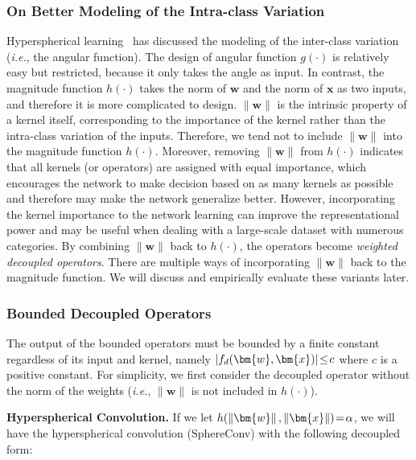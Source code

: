 \subsubsection{On Better Modeling of the Intra-class Variation}

Hyperspherical learning~\cite{liu2017deephyper} has discussed the modeling of the inter-class variation (\emph{i.e.}, the angular function). The design of angular function $g(\cdot)$ is relatively easy but restricted, because it only takes the angle as input. In contrast, the magnitude function $h(\cdot)$ takes the norm of $\bm{w}$ and the norm of $\bm{x}$ as two inputs, and therefore it is more complicated to design. $\|\bm{w}\|$ is the intrinsic property of a kernel itself, corresponding to the importance of the kernel rather than the intra-class variation of the inputs. Therefore, we tend not to include $\|\bm{w}\|$ into the magnitude function $h(\cdot)$. Moreover, removing $\|\bm{w}\|$ from $h(\cdot)$ indicates that all kernels (or operators) are assigned with equal importance, which encourages the network to make decision based on as many kernels as possible and therefore may make the network generalize better. However, incorporating the kernel importance to the network learning can improve the representational power and may be useful when dealing with a large-scale dataset with numerous categories. By combining $\|\bm{w}\|$ back to $h(\cdot)$, the operators become \emph{weighted decoupled operators}. There are multiple ways of incorporating $\|\bm{w}\|$ back to the magnitude function. We will discuss and empirically evaluate these variants later.

\subsubsection{Bounded Decoupled Operators}

The output of the bounded operators must be bounded by a finite constant regardless of its input and kernel, namely $\thickmuskip=2mu \medmuskip=2mu |f_d(\bm{w},\bm{x})|\leq c$ where $c$ is a positive constant. For simplicity, we first consider the decoupled operator without the norm of the weights (\emph{i.e.}, $\|\bm{w}\|$ is not included in $h(\cdot)$).
\par

\textbf{Hyperspherical Convolution.} If we let $\thickmuskip=2mu \medmuskip=2mu h(\left\lVert\bm{w}\right\rVert,\left\lVert\bm{x}\right\rVert)=\alpha$, we will have the hyperspherical convolution (SphereConv) with the following decoupled form:

